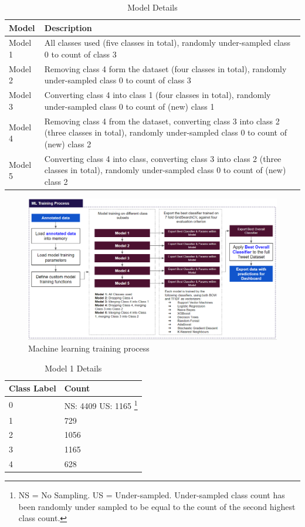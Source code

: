 \documentclass[12pt]{article}
\begin{document}
\begin{table}[tbp]
\centering
\begin{tabularx}{\linewidth}{ l X}
\toprule
   Model & Description \\
\midrule

Model 1 & All classes used (five classes in total), randomly under-sampled class 0 to count of class 3\\
Model 2 & Removing class 4 form the dataset (four classes in total), randomly under-sampled class 0 to count of class 3\\
Model 3 & Converting class 4 into class 1 (four classes in total), randomly under-sampled class 0 to count of (new) class 1\\
Model 4 & Removing class 4 from the dataset, converting class 3 into class 2 (three classes in total), randomly under-sampled class 0 to count of (new) class 2\\
Model 5 & Converting class 4 into class, converting class 3 into class 2 (three classes in total), randomly under-sampled class 0 to count of (new) class 2\\

\bottomrule
\end{tabularx}
\caption{Model Details}
\label{tbl:model_details}
\end{table}

\newpage

\begin{figure}[tbp]
\centering 
\includegraphics[width=1\textwidth]{figures/ml_train}
\caption{Machine learning training process} 
\label{fig:ml_train}
\end{figure}


\begin{table}[tbp]
\centering
\begin{tabularx}{\linewidth}{ l X}
\toprule
   Class Label & Count \\
\midrule
0 & NS: 4409 \newline US: 1165 \footnote{NS = No Sampling. US = Under-sampled. Under-sampled class count has been randomly under sampled to be equal to the count of the second highest class count.}\\
1 & 729\\
2 & 1056\\
3 & 1165\\
4 & 628\\
\bottomrule
\end{tabularx}
\caption{Model 1 Details}
\label{tbl:model1_details}
\end{table}
\end{document}
